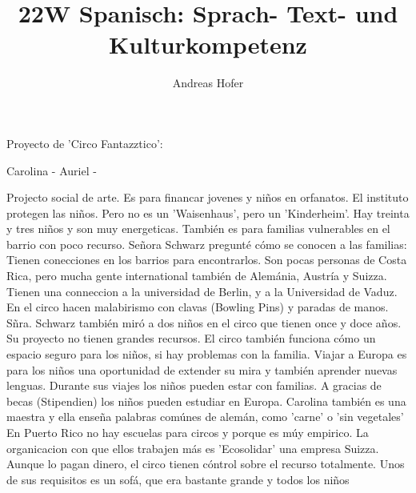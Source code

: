 \documentclass{article}
\title{\vspace{-3cm}22W Spanisch: Sprach- Text- und Kulturkompetenz}
\author{Andreas Hofer}
\begin{document}
	Proyecto de 'Circo Fantazztico':

	Carolina - 
	Auriel - 

	Projecto social de arte. Es para financar jovenes y niños en orfanatos. El instituto protegen las niños. Pero no es un 'Waisenhaus', pero un 'Kinderheim'. Hay treinta y tres niños y son muy energeticas.
	También es para familias vulnerables en el barrio con poco recurso.
	Señora Schwarz pregunté cómo se conocen a las familias:
	Tienen conecciones en los barrios para encontrarlos.
	Son pocas personas de Costa Rica, pero mucha gente international también de Alemánia, Austría y Suizza.
	Tienen una conneccion a la universidad de Berlin, y a la Universidad de Vaduz.
	En el circo hacen malabirismo con clavas (Bowling Pins) y paradas de manos.
	Sñra. Schwarz también miró a dos niños en el circo que tienen once y doce años.
	Su proyecto no tienen grandes recursos.
	El circo también funciona cómo un espacio seguro para los niños, si hay problemas con la familia.
	Viajar a Europa es para los niños una oportunidad de extender su mira y también aprender nuevas lenguas.
	Durante sus viajes los niños pueden estar con familias.
	A gracias de becas (Stipendien) los niños pueden estudiar en Europa.
	Carolina también es una maestra y ella enseña palabras comúnes de alemán, como 'carne' o 'sin vegetales'
	En Puerto Rico no hay escuelas para circos y porque es múy empirico.
	La organicacion con que ellos trabajen más es 'Ecosolidar' una empresa Suizza. Aunque lo pagan dinero, el circo tienen cóntrol sobre el recurso totalmente.
	Unos de sus requisitos es un sofá, que era bastante grande y todos los niños 
\end{document}
